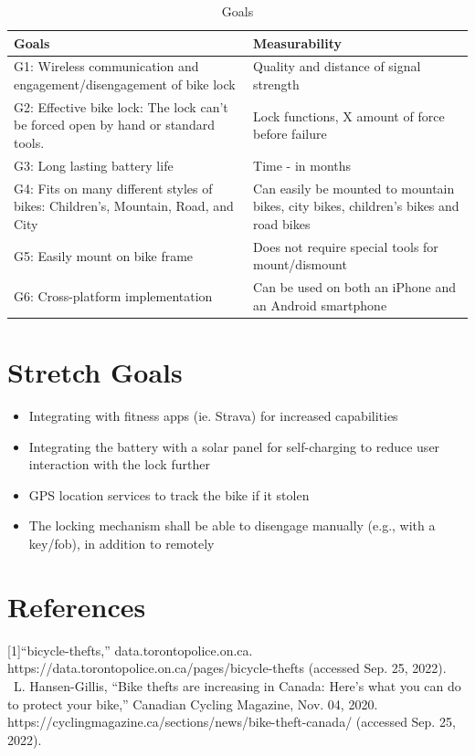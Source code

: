 \documentclass{article}
\begin{document}
\begin{table}[hp]
  \begin{center}
    \caption{Goals} \label{TblGoals}
    \begin{tabular}{| p{0.52\linewidth} | p{0.6\linewidth} |}
    \hline
      \textbf{Goals} & \textbf{Measurability}\\
      \hline
      G1: Wireless communication and \newline engagement/disengagement of bike lock  & Quality and distance of signal strength\\
      \hline
      G2: Effective bike lock: The lock can't be forced open by hand or standard tools.  & Lock functions, X amount of force before failure\\
      \hline
      G3: Long lasting battery life  & Time - in months \\
      \hline
     G4: Fits on many different styles of bikes: Children's, Mountain, Road, and City & Can easily be mounted to mountain bikes, city bikes, children's bikes and road bikes \\
      \hline
      G5: Easily mount on bike frame & Does not require special tools for mount/dismount\\
      \hline
       G6: Cross-platform implementation & Can be used on both an iPhone and an Android smartphone\\
      \hline
    \end{tabular}
  \end{center}
\end{table}

\section{Stretch Goals}
\begin{itemize}
\item Integrating with fitness apps (ie. Strava) for increased capabilities
\item Integrating the battery with a solar panel for self-charging to reduce user interaction with the lock further
\item GPS location services to track the bike if it stolen
\item The locking mechanism shall be able to disengage manually (e.g., with a key/fob), in addition to remotely
\end{itemize}

\newpage
\section{References}

[1]“bicycle-thefts,” data.torontopolice.on.ca. https://data.torontopolice.on.ca/pages/bicycle-thefts (accessed Sep. 25, 2022).
~\newline
[2]L. Hansen-Gillis, “Bike thefts are increasing in Canada: Here’s what you can do to protect your bike,” Canadian Cycling Magazine, Nov. 04, 2020. https://cyclingmagazine.ca/sections/news/bike-theft-canada/ (accessed Sep. 25, 2022).
‌
‌
\end{document}
